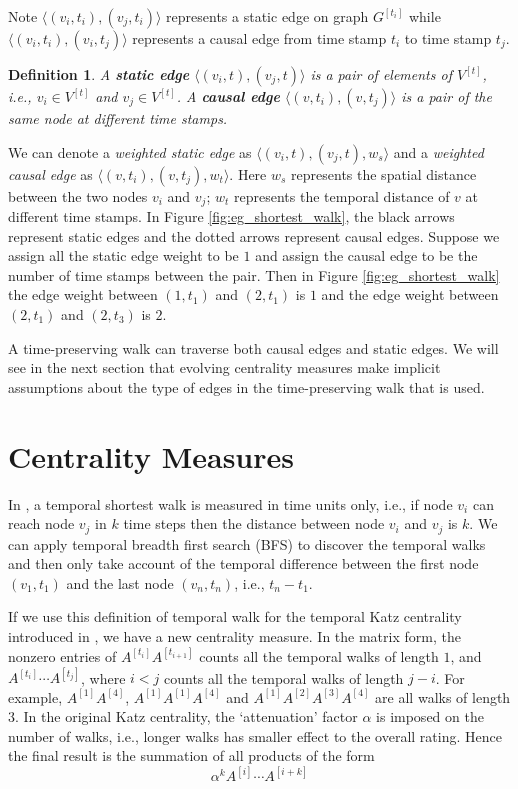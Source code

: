 \documentclass[12pt]{article}
\newtheorem{definition}{Definition}
\theoremstyle{definition}
\begin{document}
Note $\langle (v_i, t_i), (v_j, t_i) \rangle$ represents a static edge on graph $G^{[t_i]}$ while $\langle (v_i, t_i), (v_i, t_j) \rangle$ represents a causal edge from time stamp $t_i$ to time stamp $t_j$.

\begin{definition}
A \textbf{static edge} $\langle (v_i, t), (v_j, t)\rangle$ is a pair of elements of $V^{[t]}$, i.e., $v_i \in V^{[t]}$ and
$v_j \in V^{[t]}$.
 A \textbf{causal edge} $\langle (v, t_i), (v, t_j)\rangle$ is a pair of the same node at different time stamps.
\end{definition}

We can denote a \emph{weighted static edge} as $\langle (v_i, t), (v_j, t), w_s \rangle$ and a \emph{weighted causal edge} as $\langle (v, t_i), (v, t_j), w_t \rangle$.
Here $w_s$ represents the spatial distance between the two nodes $v_i$ and $v_j$; $w_t$ represents the
temporal distance of $v$ at different time stamps.
In Figure \ref{fig:eg_shortest_walk}, the black arrows represent static edges and the dotted arrows represent causal edges.
Suppose we assign all the static edge weight to be $1$ and
assign the causal edge to be the number of time stamps between the pair. Then in Figure \ref{fig:eg_shortest_walk}
the edge weight between $(1, t_1)$ and $(2, t_1)$ is $1$ and the edge weight between $(2, t_1)$ and $(2, t_3)$
 is $2$.

A time-preserving walk can traverse both causal edges and static edges.
We will see in the next section that evolving centrality measures make implicit assumptions about the type of edges in the
time-preserving walk that is used.



\section{Centrality Measures}
\label{sec:topol-temp-flow}

In \cite{tang10s}, a temporal shortest walk is measured in time units only, i.e., if node
$v_i$ can reach node $v_j$ in $k$ time steps then the distance between node
$v_i$ and $v_j$ is $k$. We can apply temporal breadth first
search (BFS) \cite{chen16} to discover the temporal walks and then only take account of the temporal difference between the first node $(v_1, t_1)$ and the last node $(v_n, t_n)$, i.e., $t_n - t_1$.

If we use this definition of temporal walk for the temporal Katz centrality introduced in
\cite{grindrod11}, we have a new centrality measure.
In the matrix form, the nonzero entries of $A^{[t_i]} A^{[t_{i+1}]}$ counts all the temporal walks of length $1$, and
$A^{[t_i]}\cdots A^{[t_j]}$, where $i < j$ counts all the temporal walks of length $j -i$.
For example, $A^{[1]}A^{[4]}$, $A^{[1]}A^{[1]}A^{[4]}$ and $A^{[1]}A^{[2]}A^{[3]}A^{[4]}$ are all walks of length 3.
In the original Katz centrality, the `attenuation' factor $\alpha$ is imposed on the
number of walks, i.e., longer walks has smaller effect to the overall rating.
Hence the final result is the summation of all products of the form
\[
\alpha^k A^{[i]} \cdots A^{[i+k]}
\]
\end{document}
